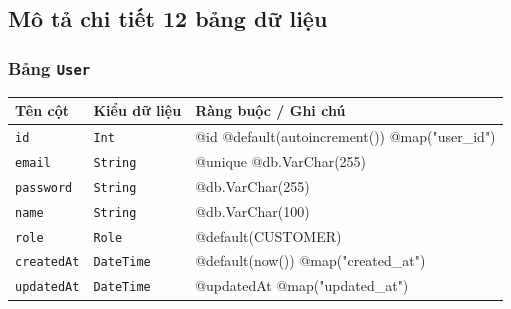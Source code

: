 \subsection{Mô tả chi tiết 12 bảng dữ liệu}
\subsubsection{Bảng \texttt{User}}
\begin{longtable}{|p{3.6cm}|p{3.0cm}|p{8.9cm}|}
\hline
\rowcolor{headerblue} \textbf{Tên cột} & \textbf{Kiểu dữ liệu} & \textbf{Ràng buộc / Ghi chú} \\ \hline
\endhead
\texttt{id} & \texttt{Int} & \small @id @default(autoincrement()) @map("user\_id") \\ \hline
\texttt{email} & \texttt{String} & \small @unique @db.VarChar(255) \\ \hline
\texttt{password} & \texttt{String} & \small @db.VarChar(255) \\ \hline
\texttt{name} & \texttt{String} & \small @db.VarChar(100) \\ \hline
\texttt{role} & \texttt{Role} & \small @default(CUSTOMER) \\ \hline
\texttt{createdAt} & \texttt{DateTime} & \small @default(now()) @map("created\_at") \\ \hline
\texttt{updatedAt} & \texttt{DateTime} & \small @updatedAt @map("updated\_at") \\ \hline
\end{longtable}

